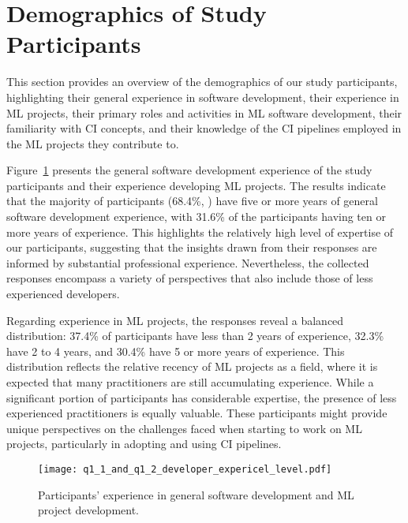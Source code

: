 \section{Demographics of Study Participants}
\label{sec:demographics}

This section provides an overview of the demographics of our study participants, highlighting their general experience in software development, their experience in ML projects, their primary roles and activities in ML software development, their familiarity with CI concepts, and their knowledge of the CI pipelines employed in the ML projects they contribute to.

Figure~\ref{fig:q1_1_and_q1_2_developer_expericel_level} presents the general software development experience of the study participants and their experience developing ML projects.
The results indicate that the majority of participants (68.4\%, ) have five or more years of general software development experience, with 31.6\% of the participants having ten or more years of experience. This highlights the relatively high level of expertise of our participants, suggesting that the insights drawn from their responses are informed by substantial professional experience. Nevertheless, the collected responses encompass a variety of perspectives that also include those of less experienced developers.

Regarding experience in ML projects, the responses reveal a balanced distribution: 37.4\% of participants have less than 2 years of experience, 32.3\% have 2 to 4 years, and 30.4\% have 5 or more years of experience.
This distribution reflects the relative recency of ML projects as a field, where it is expected that many practitioners are still accumulating experience. While a significant portion of participants has considerable expertise, the presence of less experienced practitioners is equally valuable. These participants might provide unique perspectives on the challenges faced when starting to work on ML projects, particularly in adopting and using CI pipelines.


\begin{figure}
	\centering
	\texttt{[image: q1\_1\_and\_q1\_2\_developer\_expericel\_level.pdf]}
	\caption{Participants' experience in general software development and ML project development.}
	\label{fig:q1_1_and_q1_2_developer_expericel_level}       %
\end{figure}

